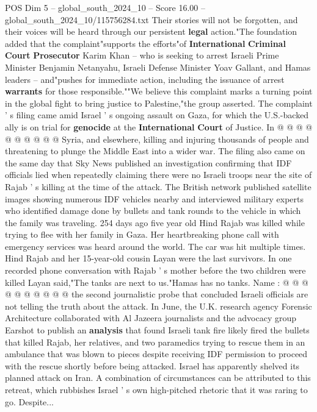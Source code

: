 \begin{textsample}{POS Dim 5 – global\_south\_2024\_10 – Score 16.00 – global\_south\_2024\_10/115756284.txt}
Their stories will not be forgotten, and their voices will be heard through our persistent \textbf{legal} action."The foundation added that the complaint"supports the efforts"of \textbf{International} \textbf{Criminal} \textbf{Court} \textbf{Prosecutor} Karim Khan -- who is seeking to arrest Israeli Prime Minister Benjamin Netanyahu, Israeli Defense Minister Yoav Gallant, and Hamas leaders -- and"pushes for immediate action, including the issuance of arrest \textbf{warrants} for those responsible.""We believe this complaint marks a turning point in the global fight to bring justice to Palestine,"the group asserted.
The complaint ' s filing came amid Israel ' s ongoing assault on Gaza, for which the U.S.-backed ally is on trial for \textbf{genocide} at the \textbf{International} \textbf{Court} of Justice.
In @ @ @ @ @ @ @ @ @ @ Syria, and elsewhere, killing and injuring thousands of people and threatening to plunge the Middle East into a wider war.
The filing also came on the same day that Sky News published an investigation confirming that IDF officials lied when repeatedly claiming there were no Israeli troops near the site of Rajab ' s killing at the time of the attack.
The British network published satellite images showing numerous IDF vehicles nearby and interviewed military experts who identified damage done by bullets and tank rounds to the vehicle in which the family was traveling. 254 days ago five year old Hind Rajab was killed while trying to flee with her family in Gaza.
Her heartbreaking phone call with emergency services was heard around the world.
The car was hit multiple times.
Hind Rajab and her 15-year-old cousin Layan were the last survivors.
In one recorded phone conversation with Rajab ' s mother before the two children were killed Layan said,"The tanks are next to us."Hamas has no tanks.
Name : @ @ @ @ @ @ @ @ @ @ the second journalistic probe that concluded Israeli officials are not telling the truth about the attack.
In June, the U.K. research agency Forensic Architecture collaborated with Al Jazeera journalists and the advocacy group Earshot to publish an \textbf{analysis} that found Israeli tank fire likely fired the bullets that killed Rajab, her relatives, and two paramedics trying to rescue them in an ambulance that was blown to pieces despite receiving IDF permission to proceed with the rescue shortly before being attacked.
Israel has apparently shelved its planned attack on Iran.
A combination of circumstances can be attributed to this retreat, which rubbishes Israel ' s own high-pitched rhetoric that it was raring to go.
Despite...

\end{textsample}
